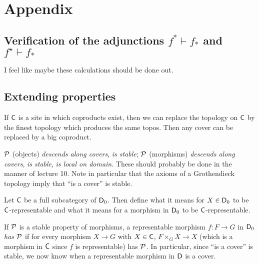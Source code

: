 \newpage
\section*{Appendix}
\renewcommand{\thesection}{A\arabic{subsection}}
\renewcommand{\thesubsection}{\thesection}
\gdef\sectionname{Appendix}
\setcounter{equation}{0}
\setcounter{footnote}{0}
\makeatletter{}\makeatother

 

\subsection{Verification of the adjunctions \texorpdfstring{$f^*\vdash f_*$ and $f^\star\vdash f_*$}{f*|- f\_*}}

I feel like maybe these calculations should be done out. 

\subsection{Extending properties}\label{ApdxSec:ExtendingProperties}

If $\C$ is a site in which coproducts exist, then we can replace the topology on $\C$ by the finest topology which produces the same topos. Then any cover can be replaced by a big coproduct. 

$\P$ (objects) \emph{descends along covers}, \emph{is stable}; $\P$ (morphisms) \emph{descends along covers}, \emph{is stable}, \emph{is local on domain}. These should probably be done in the manner of lecture 10. Note in particular that the axioms of a Grothendieck topology imply that ``is a cover'' is stable.

Let $\C$ be a full subcategory of $\D_0$. Then define what it means for $X\in \D_0$ to be $\C$-representable and what it means for a morphism in $\D_0$ to be $\C$-representable.

If $\P$ is a stable property of morphisms, a representable morphism $f:F\to G$ in $\D_0$ \emph{has $\P$} if for every morphism $X\to G$ with $X\in \C$, $F\times_G X\to X$ (which is a morphism in $\C$ since $f$ is representable) has $\P$. In particular, since ``is a cover'' is stable, we now know when a representable morphism in $\D$ is a cover.

